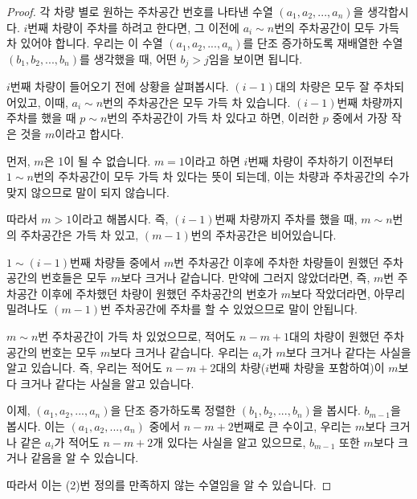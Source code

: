 \documentclass[a4paper, 12pt]{article}
\begin{document}
\begin{proof}
각 차량 별로 원하는 주차공간 번호를 나타낸 수열 $(a_1, a_2, ... , a_n)$을 생각합시다. $i$번째 차량이 주차를 하려고 한다면, 그 이전에 $a_i \sim n$번의 주차공간이 모두 가득 차 있어야 합니다. 우리는 이 수열 $(a_1, a_2, ... , a_n)$를 단조 증가하도록 재배열한 수열 $(b_1, b_2, ... , b_n)$를 생각했을 때, 어떤 $b_j > j$임을 보이면 됩니다.

$i$번째 차량이 들어오기 전에 상황을 살펴봅시다. $(i-1)$대의 차량은 모두 잘 주차되어있고, 이때, $a_i \sim n$번의 주차공간은 모두 가득 차 있습니다. $(i-1)$번째 차량까지 주차를 했을 때 $p \sim n$번의 주차공간이 가득 차 있다고 하면, 이러한 $p$ 중에서 가장 작은 것을 $m$이라고 합시다.

먼저, $m$은 1이 될 수 없습니다. $m = 1$이라고 하면 $i$번째 차량이 주차하기 이전부터 $1 \sim n$번의 주차공간이 모두 가득 차 있다는 뜻이 되는데, 이는 차량과 주차공간의 수가 맞지 않으므로 말이 되지 않습니다.

따라서 $m>1$이라고 해봅시다. 즉, $(i-1)$번째 차량까지 주차를 했을 때, $m \sim n$번의 주차공간은 가득 차 있고, $(m-1)$번의 주차공간은 비어있습니다.

$1 \sim (i-1)$번째 차량들 중에서 $m$번 주차공간 이후에 주차한 차량들이 원했던 주차공간의 번호들은 모두 $m$보다 크거나 같습니다. 만약에 그러지 않았더라면, 즉, $m$번 주차공간 이후에 주차했던 차량이 원했던 주차공간의 번호가 $m$보다 작았더라면, 아무리 밀려나도 $(m-1)$번 주차공간에 주차를 할 수 있었으므로 말이 안됩니다.

$m \sim n$번 주차공간이 가득 차 있었으므로, 적어도 $n-m+1$대의 차량이 원했던 주차공간의 번호는 모두 $m$보다 크거나 같습니다. 우리는 $a_i$가 $m$보다 크거나 같다는 사실을 알고 있습니다. 즉, 우리는 적어도 $n-m+2$대의 차량($i$번째 차량을 포함하여)이 $m$보다 크거나 같다는 사실을 알고 있습니다.

이제, $(a_1, a_2, ... , a_n)$을 단조 증가하도록 정렬한 $(b_1, b_2, ... , b_n)$을 봅시다. $b_{m-1}$을 봅시다. 이는 $(a_1, a_2, ... , a_n)$ 중에서 $n-m+2$번째로 큰 수이고, 우리는 $m$보다 크거나 같은 $a_i$가 적어도 $n-m+2$개 있다는 사실을 알고 있으므로, $b_{m-1}$ 또한 $m$보다 크거나 같음을 알 수 있습니다.

따라서 이는 (2)번 정의를 만족하지 않는 수열임을 알 수 있습니다.

\end{proof}
\end{document}
